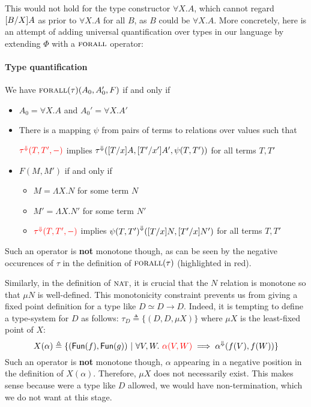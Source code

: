 \documentclass{article} \usepackage{chtt-notes} \usepackage{stmaryrd}
\newcommand{\lift}[1]{{#1}^{\Downarrow}}
\begin{document}
This would not hold for the type constructor $\forall X. A$, which
cannot regard $[B/X]A$ as prior to $\forall X. A$ for all
$B$, as $B$ could be $\forall X. A$. More concretely, here is an
attempt of adding universal quantification over types in our language
by extending $\Phi$ with a $\textsc{forall}$ operator:

\paragraph{Type quantification} 
We have $\textsc{forall}(\tau)(A_0, A'_0, F)$ if and only if
\begin{itemize}
\item $A_0 = \forall X. A$ and $A_0' = \forall X. A'$
\item There is a mapping $\psi$ from pairs of terms to relations over
  values such that
  \begin{center}
    $\color{red}{\lift{\tau}(T, T', -)}$ implies
    $\lift{\tau}(\subst{T}{x}{A}, \subst{T'}{x'}{A'}, \psi(T, T'))$ for all terms $T, T'$
  \end{center}
\item $F(M, M')$ if and only if
  \begin{itemize}
  \item $M = \Lambda X. N$ for some term $N$
  \item $M' = \Lambda X. N'$ for some term $N'$
  \item $\color{red}{\lift{\tau}(T, T', -)}$ implies
    $\lift{\psi(T, T')} (\subst{T}{x}{N}, \subst{T'}{x}{N'})$ for all
    terms $T, T'$
  \end{itemize}
\end{itemize}

Such an operator is \textbf{not} monotone though, as can be seen by
the negative occurences of $\tau$ in the definition of
$\textsc{forall}(\tau)$ (highlighted in red).

\bigskip

Similarly, in the definition of $\textsc{nat}$, it is crucial that the
$N$ relation is monotone so that $\mu N$ is well-defined.  This
monotonicity constraint prevents us from giving a fixed point
definition for a type like $D \simeq D \to D$. Indeed, it is tempting
to define a type-system for $D$ as follows:
$\tau_D \triangleq \{(D, D, \mu X)\}$ where $\mu X$ is the least-fixed
point of $X$:
\[ X(\alpha) \triangleq \{ (\textsf{Fun}(f), \textsf{Fun}(g)) \ | \
  \forall V, W. \ {\color{red}{\alpha(V, W)}} \implies
  \lift{\alpha}(f(V), f(W)) \} \] Such an operator is \textbf{not}
monotone though, $\alpha$ appearing in a negative position in the
definition of $X(\alpha)$. Therefore, $\mu X$ does not necessarily
exist. This makes sense because were a type like $D$ allowed, we would
have non-termination, which we do not want at this stage.


 
\end{document}
